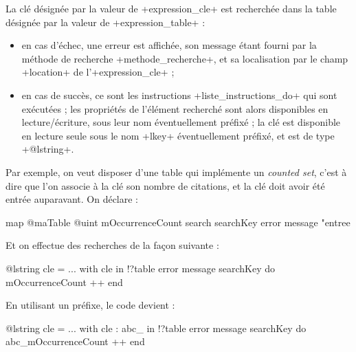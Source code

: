 La clé désignée par la valeur de \ggs+expression_cle+ est recherchée dans la table désignée par la valeur de \ggs+expression_table+ :
\begin{itemize}
  \item en cas d'échec, une erreur est affichée, son message étant fourni par la méthode de recherche \ggs+methode_recherche+, et sa localisation par le champ \ggs+location+ de l'\ggs+expression_cle+ ;
  \item en cas de succès, ce sont les instructions \ggs+liste_instructions_do+ qui sont exécutées ; les propriétés de l'élément recherché sont alors disponibles en lecture/écriture, sous leur nom éventuellement préfixé ; la clé est disponible en lecture seule sous le nom \ggs+lkey+ éventuellement préfixé, et est de type \ggs+@lstring+.
\end{itemize}

Par exemple, on veut disposer d'une table qui implémente un \emph{counted set}, c'est à dire que l'on associe à la clé son nombre de citations, et la clé doit avoir été entrée auparavant. On déclare :
\begin{galgas}
map @maTable {
  @uint mOccurrenceCount
  search searchKey error message "entree %
}
\end{galgas}

Et on effectue des recherches de la façon suivante :
\begin{galgas}
@lstring cle = ...
with cle in !?table error message searchKey do
  mOccurrenceCount ++
end
\end{galgas}

En utilisant un préfixe, le code devient :
\begin{galgas}
@lstring cle = ...
with cle : abc_ in !?table error message searchKey do
  abc_mOccurrenceCount ++
end
\end{galgas}

